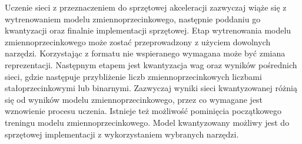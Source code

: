 Uczenie sieci z przeznaczeniem do sprzętowej akceleracji zazwyczaj wiąże się z wytrenowaniem modelu zmiennoprzecinkowego, następnie poddaniu go kwantyzacji oraz finalnie implementacji sprzętowej.
Etap wytrenowania modelu zmiennoprzecinkowego może zostać przeprowadzony z użyciem
dowolnych narzędzi.
Korzystając z formatu nie wspieranego wymagana może być zmiana reprezentacji.
Następnym etapem jest kwantyzacja wag oraz wyników pośrednich sieci, gdzie następuje przybliżenie liczb zmiennoprzecinkowych liczbami stałoprzecinkowymi lub binarnymi. 
Zazwyczaj wyniki sieci kwantyzowanej różnią się od wyników modelu zmiennoprzecinkowego, przez co wymagane jest wznowienie procesu uczenia.
Istnieje też możliwość pominięcia początkowego treningu modelu zmiennoprzecinkowego.
Model kwantyzowany możliwy jest do sprzętowej implementacji z wykorzystaniem wybranych narzędzi.

